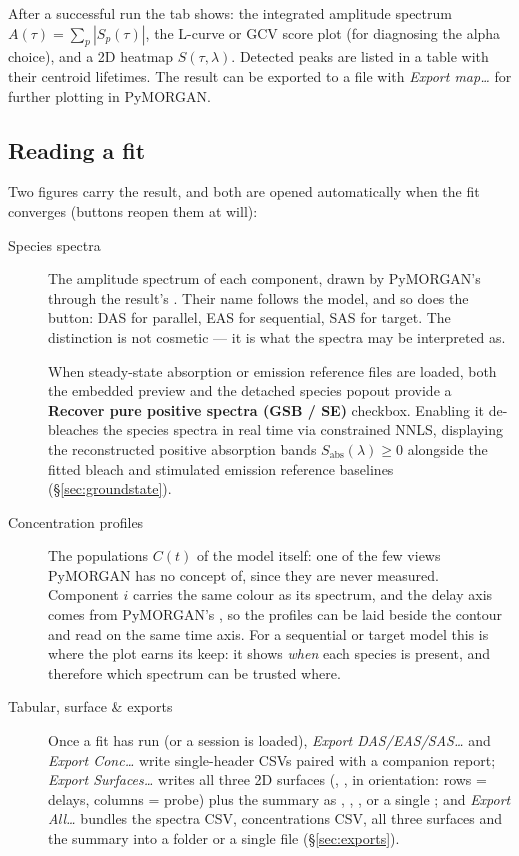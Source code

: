 After a successful run the tab shows: the integrated amplitude spectrum
$A(\tau) = \sum_p |S_{p}(\tau)|$, the L-curve or GCV score plot (for diagnosing
the alpha choice), and a 2D heatmap $S(\tau,\lambda)$. Detected peaks are
listed in a table with their centroid lifetimes. The result can be exported to a
 file with \emph{Export map\ldots} for further plotting in PyMORGAN.

\subsection{Reading a fit}

Two figures carry the result, and both are opened automatically when the fit
converges (buttons reopen them at will):

\begin{description}
  \item[Species spectra] The amplitude spectrum of each component, drawn by
    PyMORGAN's  through the result's
    . Their name follows the model, and so does the
    button: DAS for parallel, EAS for sequential, SAS for target. The
    distinction is not cosmetic --- it is what the spectra may be interpreted
    as.

    When steady-state absorption or emission reference files are loaded, both
    the embedded preview and the detached species popout provide a
    \textbf{Recover pure positive spectra (GSB / SE)} checkbox. Enabling it
    de-bleaches the species spectra in real time via constrained NNLS, displaying
    the reconstructed positive absorption bands $S_{\mathrm{abs}}(\lambda) \ge 0$
    alongside the fitted bleach and stimulated emission reference baselines
    (\S\ref{sec:groundstate}).
  \item[Concentration profiles] The populations $C(t)$ of the model itself: one
    of the few views PyMORGAN has no concept of, since they are never measured.
    Component $i$ carries the same colour as its spectrum, and the delay axis
    comes from PyMORGAN's , so the profiles can be laid
    beside the contour and read on the same time axis. For a sequential or
    target model this is where the plot earns its keep: it shows \emph{when}
    each species is present, and therefore which spectrum can be trusted where.
  \item[Tabular, surface \&  exports] Once a fit has run (or a
     session is loaded), \emph{Export DAS/EAS/SAS\ldots} and
    \emph{Export Conc\ldots} write single-header CSVs paired with a companion
     report; \emph{Export Surfaces\ldots} writes
    all three 2D surfaces (, ,  in
     orientation: rows = delays, columns = probe) plus the summary
    as , , , or a single ; and
    \emph{Export All\ldots} bundles the spectra CSV, concentrations CSV, all
    three surfaces and the  summary into a folder or a single
     file (\S\ref{sec:exports}).
\end{description}

